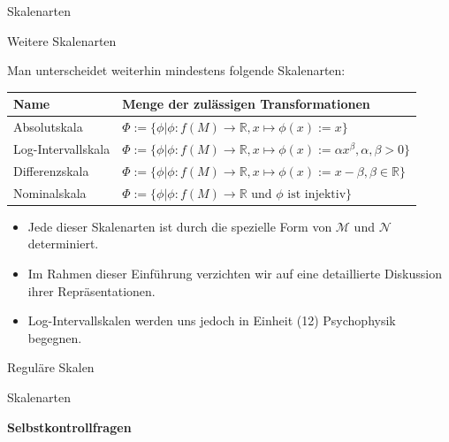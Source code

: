 \documentclass[
  8pt,
  ignorenonframetext,
]{beamer}
\providecommand{\tightlist}{%
  \setlength{\itemsep}{0pt}\setlength{\parskip}{0pt}}
\begin{document}
\begin{frame}{Skalenarten}
\protect\hypertarget{skalenarten-8}{}
\small

Weitere Skalenarten

\footnotesize

Man unterscheidet weiterhin mindestens folgende Skalenarten:

\center
\begin{tabular}{ll}
Name                & Menge der zulässigen Transformationen                                                                     \\\hline
Absolutskala        & $\Phi := \{\phi| \phi : f(M) \to \mathbb{R}, x \mapsto \phi(x) := x\}$                                    \\
Log-Intervallskala  & $\Phi := \{\phi| \phi : f(M) \to \mathbb{R}, x \mapsto \phi(x) := \alpha x^{\beta}, \alpha,\beta >0\}$    \\
Differenzskala      & $\Phi := \{\phi| \phi : f(M) \to \mathbb{R}, x \mapsto \phi(x) := x - \beta, \beta \in \mathbb{R}\}$      \\
Nominalskala        & $\Phi := \{\phi| \phi : f(M) \to \mathbb{R} \mbox{ und } \phi \mbox{ ist injektiv}\}$                     \\\hline
\end{tabular}

\begin{itemize}
\tightlist
\item
  Jede dieser Skalenarten ist durch die spezielle Form von
  \(\mathcal{M}\) und \(\mathcal{N}\) determiniert.
\item
  Im Rahmen dieser Einführung verzichten wir auf eine detaillierte
  Diskussion ihrer Repräsentationen.
\item
  Log-Intervallskalen werden uns jedoch in Einheit (12) Psychophysik
  begegnen.
\end{itemize}
\end{frame}

\begin{frame}{}
\protect\hypertarget{section-5}{}
\vfill
\Large
{}

Reguläre Skalen

Skalenarten

\textbf{Selbstkontrollfragen} \vfill
\end{frame}
\end{document}

